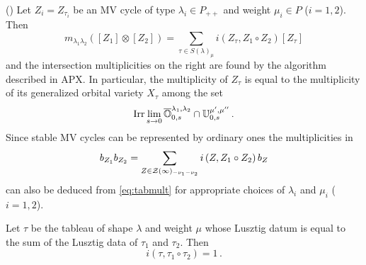 \documentclass[draft]{article}
\begin{document}
\begin{proposition}(\cite{baumann2019mirkovic})
    Let $Z_{i} = Z_{\tau_i}$  be an MV cycle of type $\lambda_i\in P_{++}$ and weight $\mu_i\in P$ ($i = 1,2$). Then 
    \begin{equation}
        m_{\lambda_1\lambda_2} ([Z_1]\otimes[Z_2]) 
        = 
        \sum_{\tau\in S(\lambda)_\mu}
        i\left(
            Z_\tau, Z_1\circ Z_2 
        \right) [Z_\tau]
    \end{equation}
    and the intersection multiplicities on the right are found by the algorithm described in APX.
    In particular, 
    the multiplicity of $Z_\tau$
    is equal to the multiplicity of its generalized orbital variety $X_\tau$ among the set 
    \begin{equation}\label{eq:tabmult}
        \operatorname{Irr}\lim_{s\to 0} \overline{\mathbb O}^{\lambda_1,\lambda_2}_{0,s}\cap\mathbb U^{\mu',\mu''}_{0,s} \,. 
    \end{equation}
    Since stable MV cycles can be represented by ordinary ones the multiplicities in 
    $$
    b_{Z_1}b_{Z_2} = \sum_{Z\in\mathcal Z(\infty)_{-\nu_1 - \nu_2}} i \left(
        Z, Z_1 \circ Z_2 
    \right) b_Z 
    $$
    can also be deduced from \cref{eq:tabmult} for appropriate choices of $\lambda_i$ and $\mu_i$ ($i = 1,2$).
\end{proposition}

\begin{conjecture}
    Let $\tau$ be the tableau of shape $\lambda$ and weight $\mu$ whose Lusztig datum is equal to the sum of the Lusztig data of $\tau_1$ and $\tau_2$. 
    Then 
    \begin{equation}
        i(\tau, 
        \tau_1 \circ \tau_2 
        ) = 1 \,. 
    \end{equation}
\end{conjecture}
\end{document}
